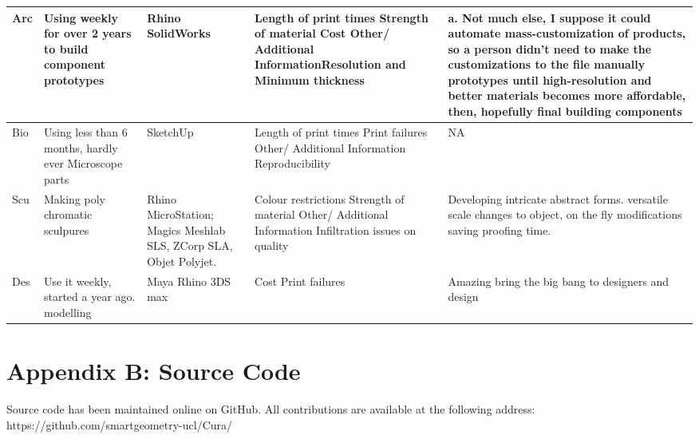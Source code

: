 \documentclass[pdftex, 11pt]{report} %
\begin{document}
\begin{longtable}{| p{1cm} | p{2.5cm} | p{2cm} | p{4cm} | p{4cm} |}
Arc & Using weekly for over 2 years to  build component prototypes & Rhino SolidWorks & Length of print times
Strength of material
Cost
Other/ Additional InformationResolution and Minimum thickness & a. Not much else, I suppose it could automate mass-customization of products, so a person didn't need to make the customizations to the file manually
prototypes until high-resolution and better materials becomes more affordable, then, hopefully final building components \\\hline

Bio  & Using less than 6 months, hardly ever
Microscope parts & SketchUp & Length of print times
Print failures
Other/ Additional Information Reproducibility & NA \\\hline

Scu & Making poly chromatic sculpures & Rhino MicroStation; Magics Meshlab  SLS, ZCorp SLA, Objet Polyjet. & Colour restrictions
Strength of material
Other/ Additional Information Infiltration issues on quality & Developing intricate abstract forms. 
versatile scale changes to object, on the fly modifications saving proofing time. \\\hline

Des & Use it weekly, started a year ago. modelling  & Maya Rhino 3DS max & Cost 
Print failures  & Amazing
bring the big bang to designers and design \\\hline



\end{longtable}



\chapter{Appendix B: Source Code}
Source code has been maintained online on GitHub. All contributions are available at the following address:
https://github.com/smartgeometry-ucl/Cura/

\nocite{*}


\end{document}
